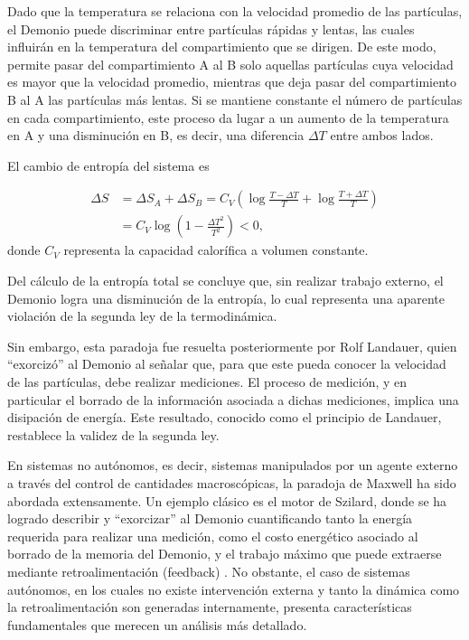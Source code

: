 Dado que la temperatura se relaciona con la velocidad promedio de las partículas, el Demonio puede discriminar entre partículas rápidas y lentas, las cuales influirán en la temperatura del compartimiento que se dirigen. De este modo, permite pasar del compartimiento A al B solo aquellas partículas cuya velocidad es mayor que la velocidad promedio, mientras que deja pasar del compartimiento B al A las partículas más lentas. Si se mantiene constante el número de partículas en cada compartimiento, este proceso da lugar a un aumento de la temperatura en A y una disminución en B, es decir, una diferencia \( \Delta T \) entre ambos lados.

El cambio de entropía del sistema es
 
\begin{align*}
    \Delta S & = \Delta S_{A} + \Delta S_{B} = C_{V}\left( \log \frac{T-\Delta T}{T} + \log \frac{T+\Delta T}{T} \right) \\
       & =  C_{V} \log \left( 1 - \frac{\Delta T^{2}}{T^{2}}  \right) < 0,
\end{align*}
donde \( C_V \) representa la capacidad calorífica a volumen constante.

Del cálculo de la entropía total se concluye que, sin realizar trabajo externo, el Demonio logra una disminución de la entropía, lo cual representa una aparente violación de la segunda ley de la termodinámica.

Sin embargo, esta paradoja fue resuelta posteriormente por Rolf Landauer, quien ``exorcizó'' al Demonio al señalar que, para que este pueda conocer la velocidad de las partículas, debe realizar mediciones. El proceso de medición, y en particular el borrado de la información asociada a dichas mediciones, implica una disipación de energía. Este resultado, conocido como el principio de Landauer, restablece la validez de la segunda ley\cite{Landauer_1961}.

En sistemas no autónomos, es decir, sistemas manipulados por un agente externo a través del control de cantidades macroscópicas, la paradoja de Maxwell ha sido abordada extensamente. Un ejemplo clásico es el motor de Szilard\cite{szilard1964decrease}, donde se ha logrado describir y ``exorcizar'' al Demonio cuantificando tanto la energía requerida para realizar una medición,  como el costo energético asociado al borrado de la memoria del Demonio, y el trabajo máximo que puede extraerse mediante retroalimentación (feedback) \cite{maruyama2009colloquium, sagawa2008second}. No obstante, el caso de sistemas autónomos, en los cuales no existe intervención externa y tanto la dinámica como la retroalimentación son generadas internamente, presenta características fundamentales que merecen un análisis más detallado.

